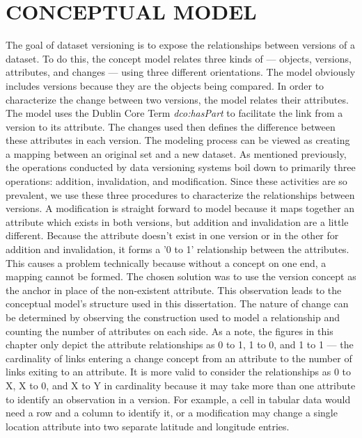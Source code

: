 
\chapter{CONCEPTUAL MODEL}\label{ch:model}

The goal of dataset versioning is to expose the relationships between versions of a dataset.
To do this, the concept model relates three kinds of --- objects, versions, attributes, and changes --- using three different orientations.
The model obviously includes versions because they are the objects being compared.
In order to characterize the change between two versions, the model relates their attributes.
The model uses the Dublin Core Term \textit{dco:hasPart} to facilitate the link from a version to its attribute.
The changes used then defines the difference between these attributes in each version.
The modeling process can be viewed as creating a mapping between an original set and a new dataset.
As mentioned previously, the operations conducted by data versioning systems boil down to primarily three operations: addition, invalidation, and modification.
Since these activities are so prevalent, we use these three procedures to characterize the relationships between versions.
A modification is straight forward to model because it maps together an attribute which exists in both versions, but addition and invalidation are a little different.
Because the attribute doesn't exist in one version or in the other for addition and invalidation, it forms a '0 to 1' relationship between the attributes.
This causes a problem technically because without a concept on one end, a mapping cannot be formed.
The chosen solution was to use the version concept as the anchor in place of the non-existent attribute.
This observation leads to the conceptual model's structure used in this dissertation.
The nature of change can be determined by observing the construction used to model a relationship and counting the number of attributes on each side.
As a note, the figures in this chapter only depict the attribute relationships as 0 to 1, 1 to 0, and 1 to 1 --- the cardinality of links entering a change concept from an attribute to the number of links exiting to an attribute.
It is more valid to consider the relationships as 0 to X, X to 0, and X to Y in cardinality because it may take more than one attribute to identify an observation in a version.
For example, a cell in tabular data would need a row and a column to identify it, or a modification may change a single location attribute into two separate latitude and longitude entries.

